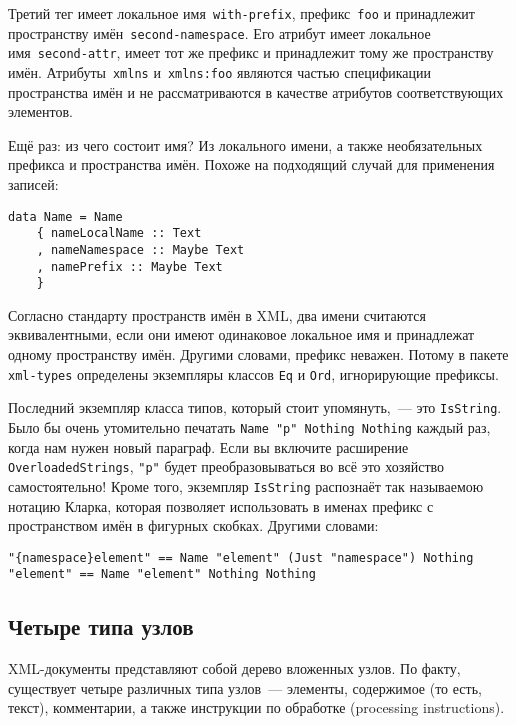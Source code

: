 Третий тег имеет локальное имя~\lstinline!with-prefix!, префикс~\lstinline!foo!
и принадлежит пространству имён~\lstinline!second-namespace!. Его атрибут имеет
локальное имя~\lstinline!second-attr!, имеет тот же префикс и принадлежит тому
же пространству имён. Атрибуты~\lstinline!xmlns! и~\lstinline!xmlns:foo!
являются частью спецификации пространства имён и не рассматриваются в качестве
атрибутов соответствующих элементов.

Ещё раз: из чего состоит имя? Из локального имени, а также необязательных
префикса и пространства имён. Похоже на подходящий случай для применения
записей:
\begin{lstlisting}
data Name = Name
    { nameLocalName :: Text
    , nameNamespace :: Maybe Text
    , namePrefix :: Maybe Text
    }
\end{lstlisting}

Согласно стандарту пространств имён в XML, два имени считаются эквивалентными,
если они имеют одинаковое локальное имя и принадлежат одному пространству имён.
Другими словами, префикс неважен. Потому в пакете \lstinline!xml-types!
определены экземпляры классов \lstinline!Eq! и \lstinline!Ord!, игнорирующие
префиксы.

Последний экземпляр класса типов, который стоит упомянуть,~--- это
\lstinline!IsString!. Было бы очень утомительно печатать
\lstinline!Name "p" Nothing Nothing!
каждый раз, когда нам нужен новый параграф. Если вы включите
расширение \lstinline!OverloadedStrings!, \lstinline!"p"! будет
преобразовываться во всё это хозяйство самостоятельно! Кроме того, экземпляр
\lstinline!IsString! распознаёт так называемою нотацию Кларка, которая
позволяет использовать в именах префикс с пространством имён в фигурных
скобках. Другими словами:
\begin{lstlisting}
"{namespace}element" == Name "element" (Just "namespace") Nothing
"element" == Name "element" Nothing Nothing
\end{lstlisting}

\subsection{Четыре типа узлов} %
XML-документы представляют собой дерево вложенных узлов. По факту, существует
четыре различных типа узлов~--- элементы, содержимое (то есть, текст),
комментарии, а также инструкции по обработке (processing instructions).

